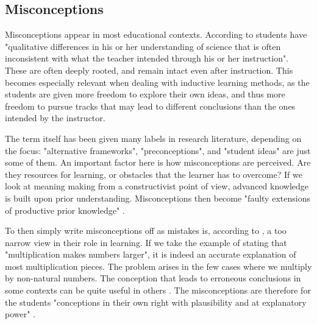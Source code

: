 \subsection{Misconceptions}
Misconceptions appear in most educational contexts. According to \citet{gomez2008elementary} students have "qualitative differences in his or her understanding of science that is often inconsistent with what the teacher intended through his or her instruction". These are often deeply rooted, and remain intact even after instruction. This becomes especially relevant when dealing with inductive learning methods, as the students are given more freedom to explore their own ideas, and thus more freedom to pursue tracks that may lead to different conclusions than the ones intended by the instructor.

The term itself has been given many labels in research literature, depending on the focus: "alternative frameworks", "preconceptions", and "student ideas" are just some of them. An important factor here is how misconceptions are perceived. Are they resources for learning, or obstacles that the learner has to overcome? If we look at meaning making from a constructivist point of view, advanced knowledge is built upon prior understanding. Misconceptions then become "faulty extensions of productive prior knowledge" \citep{smith1994misconceptions}.

To then simply write misconceptions off as mistakes is, according to \citet{smith1994misconceptions}, a too narrow view in their role in learning. If we take the example of stating that "multiplication makes numbers larger", it is indeed an accurate explanation of most multiplication pieces. The problem arises in the few cases where we multiply by non-natural numbers. The conception that leads to erroneous conclusions in some contexts can be quite useful in others \citep{smith1994misconceptions}. The misconceptions are therefore for the students "conceptions in their own right with plausibility and at explanatory power" \citetext{Smith, diSessa \& Roschelle 1993, referenced in \citealp{larkin2012misconceptions}}. 


